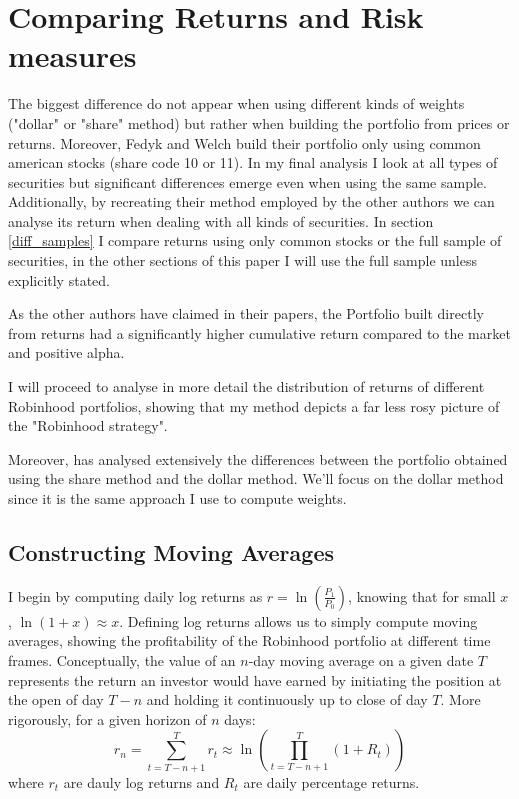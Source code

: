 
\section{Comparing Returns and Risk measures}\label{return_section}
The biggest difference do not appear when using different kinds of weights ("dollar" or "share" method) but rather when building the portfolio from prices or returns. 
Moreover, Fedyk and Welch build their portfolio only using common american stocks (share code 10 or 11). 
In my final analysis I look at all types of securities but significant differences emerge even when using the same sample. 
Additionally, by recreating their method employed by the other authors we can analyse its return when dealing with all kinds of securities. 
In section \ref{diff_samples} I compare returns using only common stocks or the full sample of securities, in the other sections of this paper I will use the full sample unless explicitly stated.

As the other authors have claimed in their papers, the Portfolio built directly from returns had a significantly higher cumulative return compared to the market and positive alpha.

I will proceed to analyse in more detail the distribution of returns of different Robinhood portfolios, showing that my method depicts a far less rosy picture of the "Robinhood strategy".

Moreover, \cite{Fedyk2024} has analysed extensively the differences between the portfolio obtained using the share method and the dollar method. 
We'll focus on the dollar method since it is the same approach I use to compute weights.

\subsection{Constructing Moving Averages}
I begin by computing daily log returns as $r = \ln\left(\frac{P_1}{P_0}\right)$, knowing that for small $x$, $\ln(1+x)\approx x$. 
Defining log returns allows us to simply compute moving averages, showing the profitability of the Robinhood portfolio at different time frames.
Conceptually, the value of an $n$-day moving average on a given date $T$ represents the return an investor would have earned by initiating the position at the open of day $T-n$ and holding it continuously up to close of day $T$.
More rigorously, for a given horizon of $n$ days:
\begin{equation}
    r_n = \sum_{t=T-n+1}^{T} r_t \approx \ln \left( \prod_{t=T-n+1}^{T} (1+R_t) \right)
\end{equation}
where $r_t$ are dauly log returns and $R_t$ are daily percentage returns.


